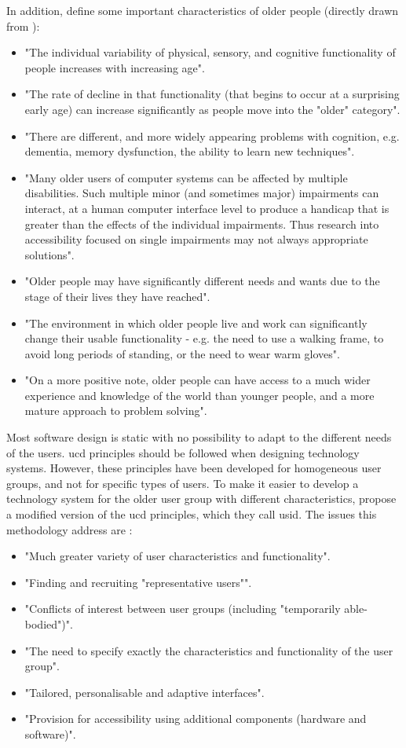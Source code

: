 In addition, \cite{gregor} define some important characteristics of older people (directly drawn from \cite{gregor}):
\begin{itemize}
\item "The individual variability of physical, sensory, and cognitive functionality of people increases with increasing age".
\item "The rate of decline in that functionality (that begins to occur at a surprising early age) can increase significantly as people move into the "older" category".
\item "There are different, and more widely appearing problems with cognition, e.g. dementia, memory dysfunction, the ability to learn new techniques".
\item "Many older users of computer systems can be affected by multiple disabilities. Such multiple minor (and sometimes major) impairments can interact, at a human computer interface level to produce a handicap that is greater than the effects of the individual impairments. Thus research into accessibility focused on single impairments may not always appropriate solutions".
\item "Older people may have significantly different needs and wants due to the stage of their lives they have reached".
\item "The environment in which older people live and work can significantly change their usable functionality - e.g. the need to use a walking frame, to avoid long periods of standing, or the need to wear warm gloves".
\item "On a more positive note, older people can have access to a much wider experience and knowledge of the world than younger people, and a more mature approach to problem solving".
\end{itemize}

Most software design is static with no possibility to adapt to the different needs of the users. \ac{ucd} principles should be followed when designing technology systems. However, these principles have been developed for homogeneous user groups, and not for specific types of users. To make it easier to develop a technology system for the older user group with different characteristics, \cite{gregor} propose a modified version of the \ac{ucd} principles, which they call \ac{usid}. The issues this methodology address are \cite{gregor}: 
\begin{itemize}
\item "Much greater variety of user characteristics and functionality". 
\item "Finding and recruiting "representative users"". 
\item "Conflicts of interest between user groups (including "temporarily able-bodied")".
\item "The need to specify exactly the characteristics and functionality of the user group".
\item "Tailored, personalisable and adaptive interfaces".
\item "Provision for accessibility using additional components (hardware and software)".
\end{itemize}

